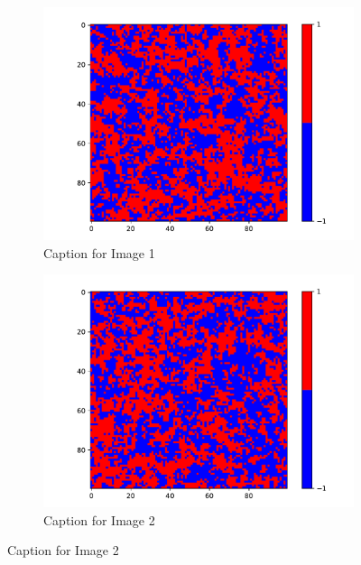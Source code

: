   \begin{figure}
    \centering
    \begin{subfigure}{0.45\textwidth}
      \centering
      \includegraphics[width=\linewidth]{images/Ising3_0.pdf}
      \caption{Caption for Image 1}
      \label{fig:image1}
    \end{subfigure}
    \hfill
    \begin{subfigure}{0.45\textwidth}
      \centering
      \includegraphics[width=\linewidth]{images/Ising3_2.pdf}
      \caption{Caption for Image 2}
      \label{fig:image2}
    \end{subfigure}
    
    \vspace{0.5cm}
    

\end{figure}
